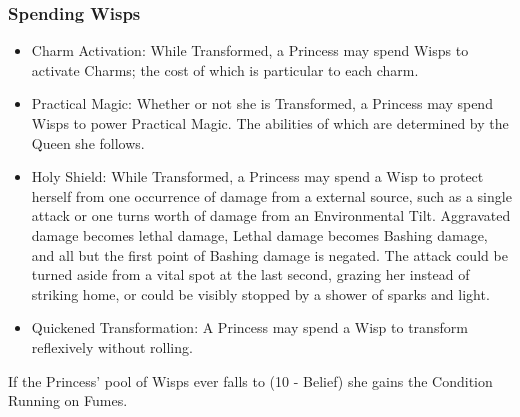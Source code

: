 \subsubsection*{Spending Wisps}
\begin{itemize}
\item    Charm Activation: While Transformed, a Princess may spend Wisps to activate Charms; the cost of which is particular to each charm.
\item    Practical Magic: Whether or not she is Transformed, a Princess may spend Wisps to power Practical Magic. The abilities of which are determined by the Queen she follows.
\item    Holy Shield: While Transformed, a Princess may spend a Wisp to protect herself from one occurrence of damage from a external source, such as a single attack or one turns worth of damage from an Environmental Tilt. Aggravated damage becomes lethal damage, Lethal damage becomes Bashing damage, and all but the first point of Bashing damage is negated. The attack could be turned aside from a vital spot at the last second, grazing her instead of striking home, or could be visibly stopped by a shower of sparks and light.
\item    Quickened Transformation: A Princess may spend a Wisp to transform reflexively without rolling. 
\end{itemize}

\noindent If the Princess' pool of Wisps ever falls to (10 - Belief) she gains the Condition Running on Fumes.

